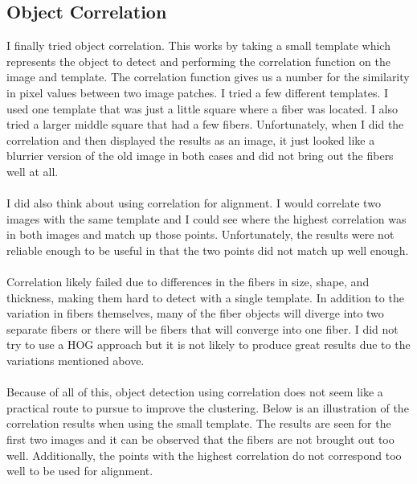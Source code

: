 \documentclass[11pt,psfig]{article}
\begin{document}
\subsection{Object Correlation}
I finally tried object correlation. This works by taking a small template which represents the object to detect and performing the correlation function on the image and template. The correlation function gives us a number for the similarity in pixel values between two image patches. I tried a few different templates. I used one template that was just a little square where a fiber was located. I also tried a larger middle square that had a few fibers. Unfortunately, when I did the correlation and then displayed the results as an image, it just looked like a blurrier version of the old image in both cases and did not bring out the fibers well at all. \\
\\
I did also think about using correlation for alignment. I would correlate two images with the same template and I could see where the highest correlation was in both images and match up those points. Unfortunately, the results were not reliable enough to be useful in that the two points did not match up well enough. \\
\\
Correlation likely failed due to differences in the fibers in size, shape, and thickness, making them hard to detect with a single template. In addition to the variation in fibers themselves, many of the fiber objects will diverge into two separate fibers or there will be fibers that will converge into one fiber. I did not try to use a HOG approach but it is not likely to produce great results due to the variations mentioned above. \\
\\
Because of all of this, object detection using correlation does not seem like a practical route to pursue to improve the clustering. Below is an illustration of the correlation results when using the small template. The results are seen for the first two images and it can be observed that the fibers are not brought out too well. Additionally, the points with the highest correlation do not correspond too well to be used for alignment.
\end{document}
